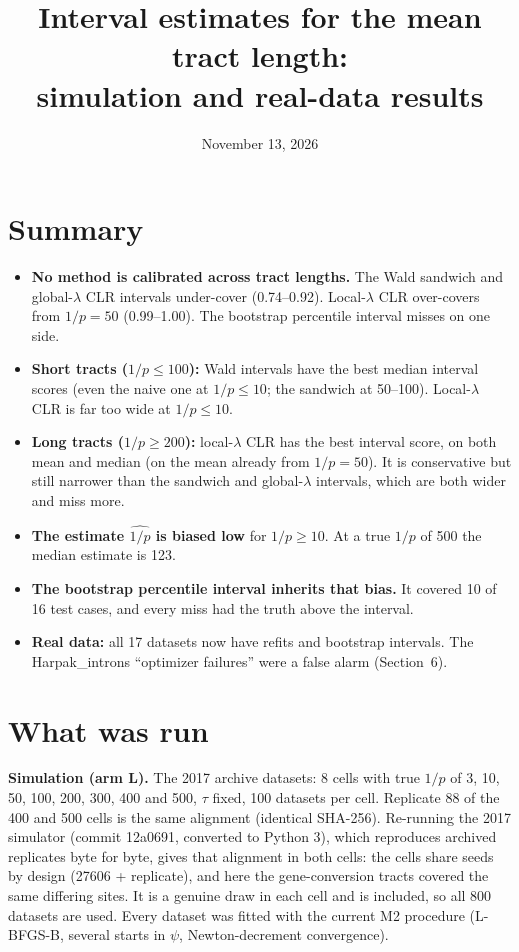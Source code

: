 \documentclass[11pt]{article}
\title{Interval estimates for the mean tract length:\\ simulation and real-data results}
\date{November 13, 2026}
\author{}
\begin{document}
\maketitle
\vspace{-3em}

\section{Summary}
\begin{itemize}
\item \textbf{No method is calibrated across tract lengths.} The Wald sandwich and global-$\lambda$ CLR intervals under-cover (0.74--0.92). Local-$\lambda$ CLR over-covers from $1/p = 50$ (0.99--1.00). The bootstrap percentile interval misses on one side.
\item \textbf{Short tracts ($1/p \le 100$):} Wald intervals have the best median interval scores (even the naive one at $1/p \le 10$; the sandwich at 50--100). Local-$\lambda$ CLR is far too wide at $1/p \le 10$.
\item \textbf{Long tracts ($1/p \ge 200$):} local-$\lambda$ CLR has the best interval score, on both mean and median (on the mean already from $1/p = 50$). It is conservative but still narrower than the sandwich and global-$\lambda$ intervals, which are both wider and miss more.
\item \textbf{The estimate $\widehat{1/p}$ is biased low} for $1/p \ge 10$. At a true $1/p$ of 500 the median estimate is 123.
\item \textbf{The bootstrap percentile interval inherits that bias.} It covered 10 of 16 test cases, and every miss had the truth above the interval.
\item \textbf{Real data:} all 17 datasets now have refits and bootstrap intervals. The Harpak\_introns ``optimizer failures'' were a false alarm (Section~6).
\end{itemize}

\section{What was run}
\textbf{Simulation (arm L).} The 2017 archive datasets: 8 cells with true $1/p$ of 3, 10, 50, 100, 200, 300, 400 and 500, $\tau$ fixed, 100 datasets per cell. Replicate 88 of the 400 and 500 cells is the same alignment (identical SHA-256). Re-running the 2017 simulator (commit 12a0691, converted to Python 3), which reproduces archived replicates byte for byte, gives that alignment in both cells: the cells share seeds by design (27606 + replicate), and here the gene-conversion tracts covered the same differing sites. It is a genuine draw in each cell and is included, so all 800 datasets are used. Every dataset was fitted with the current M2 procedure (L-BFGS-B, several starts in $\psi$, Newton-decrement convergence).
\end{document}
